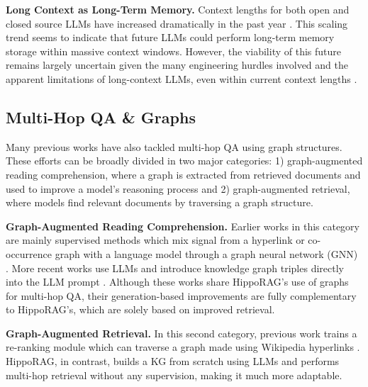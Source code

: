 \documentclass{article}
\begin{document}

\noindent \textbf{Long Context as Long-Term Memory.} Context lengths for both open and closed source LLMs have increased dramatically in the past year \cite{longlora, Ding2024LongRoPEEL, fu2024data, peng2023yarn,geminiteam2024gemini}. This scaling trend seems to indicate that future LLMs could perform long-term memory storage within massive context windows. However, the viability of this future remains largely uncertain given the many engineering hurdles involved and the apparent limitations of long-context LLMs, even within current context lengths \cite{levy2024task, li2024longcontext, zhang2024inftybench, fu2024challengesdeployinglongcontexttransformers}.

\subsection{Multi-Hop QA \& Graphs}

Many previous works have also tackled multi-hop QA using graph structures. These efforts can be broadly divided in two major categories: 1) graph-augmented reading comprehension, where a graph is extracted from retrieved documents and used to improve a model's reasoning process and 2) graph-augmented retrieval, where models find relevant documents by traversing a graph structure.

\noindent \textbf{Graph-Augmented Reading Comprehension.} Earlier works in this category are mainly supervised methods which mix signal from a hyperlink or co-occurrence graph with a language model through a graph neural network (GNN) \cite{fang-etal-2020-hierarchical, ramesh-etal-2023-single, qiu-etal-2019-dynamically}. More recent works use LLMs and introduce knowledge graph triples directly into the LLM prompt \cite{park2024graphelicitationguidingmultistep, li-du-2023-leveraging, liu-etal-2024-era}. Although these works share HippoRAG's use of graphs for multi-hop QA, their generation-based improvements are fully complementary to HippoRAG's, which are solely based on improved retrieval.

\noindent \textbf{Graph-Augmented Retrieval.} In this second category, previous work trains a re-ranking module which can traverse a graph made using Wikipedia hyperlinks \cite{ding-etal-2019-cognitive, zhu-etal-2021-adaptive, nie-etal-2019-revealing, das-etal-2019-multi, Asai2020Learning, li_hoptriever}. HippoRAG, in contrast, builds a KG from scratch using LLMs and performs multi-hop retrieval without any supervision, making it much more adaptable.
\end{document}
